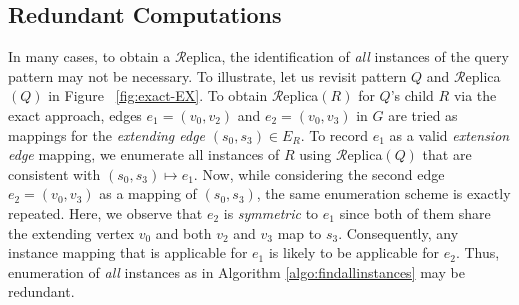\subsection{Redundant Computations }
In many cases, to obtain a $\mathcal{R}$eplica, the identification of \emph{all}
instances of the query pattern may not be necessary. To illustrate, let us
revisit pattern $Q$ and $\mathcal{R}$eplica$(Q)$ in Figure ~\ref{fig:exact-EX}.
To obtain $\mathcal{R}$eplica$(R)$ for $Q$'s child $R$ via the exact approach,
edges $e_{1}=(v_{0}, v_{2})$ and $e_{2}=(v_{0}, v_{3})$ in $G$ are tried as
mappings for the \textit{extending edge} $(s_0, s_3)\in E_R$. To record $e_1$ as
a valid \textit{extension edge} mapping, we enumerate all instances of $R$ using
$\mathcal{R}$eplica$(Q)$ that are consistent with $(s_0,s_3)\mapsto e_1$. Now,
while considering the second edge $e_{2}=(v_{0}, v_{3})$ as a mapping of
$(s_0,s_3)$, the same enumeration scheme is exactly repeated. Here, we observe
that $e_2$ is \emph{symmetric} to $e_1$ since both of them share the extending
vertex $v_0$ and both $v_2$ and $v_3$ map to $s_3$. Consequently, any
instance mapping that is applicable for $e_1$ is likely to be
applicable for $e_2$. Thus, enumeration of \textit{all} instances as in
Algorithm \ref{algo:findallinstances} may be redundant. %

